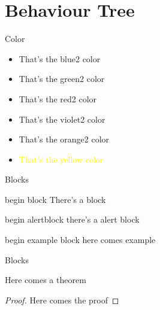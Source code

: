 \section{Behaviour Tree}
 \frame{\sectionpage}

\begin{frame}{Color}

\begin{itemize}
    \item \textcolor{blue2}{That's the blue2 color}
    \item \textcolor{green2}{That's the green2 color}
    \item \textcolor{red2}{That's the red2 color}
    \item \textcolor{violet2}{That's the violet2 color}
    \item \textcolor{orange2}{That's the orange2 color}
    \item \textcolor{yellow}{That's the yellow color}
\end{itemize}
    
\end{frame}

\begin{frame}{Blocks}
\begin{block}{begin block}
There's a block
\end{block}

\begin{alertblock}{begin alertblock}
    there's a alert block 
\end{alertblock}

\begin{exampleblock}{begin example block}
here comes example
\end{exampleblock} 

\end{frame}


\begin{frame}{Blocks}
    
\begin{theorem}
    Here comes a theorem
\end{theorem}

\begin{proof}
    Here comes the proof
\end{proof}


    
\end{frame}